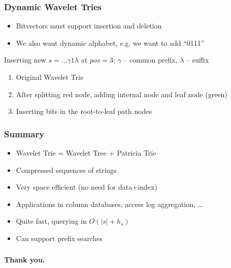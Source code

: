 \documentclass{beamer}
\begin{document}
\begin{frame}
\frametitle{Dynamic Wavelet Tries}
\begin{itemize}
  \item Bitvectors must support insertion and deletion
  \item We also want dynamic alphabet, e.g. we want to add ``0111'' 
\end{itemize}
\begin{figure}[b]
\end{figure}
Inserting new $s = \ldots\gamma 1 \lambda$ at $pos=3$; $\gamma$ -- common prefix, $\lambda$ -- suffix
\begin{enumerate}
  \item Original Wavelet Trie
  \item After splitting red node, adding internal node and leaf node (green)
  \item Inserting bits in the root-to-leaf path nodes
\end{enumerate}
\end{frame}

\begin{frame}
\frametitle{Summary}
\begin{itemize}
  \item Wavelet Trie = Wavelet Tree + Patricia Trie
  \item Compressed sequences of strings
  \item Very space efficient (no need for data+index)
  \item Applications in column databases, access log aggregation, \ldots
  \item Quite fast, querying in $O(|s|+h_s)$
  \item Can support prefix searches
\end{itemize}
\end{frame}

\begin{frame}
\frametitle{}
\begin{center}
\large \bf Thank you.
\end{center}
\end{frame}
 
\end{document}
